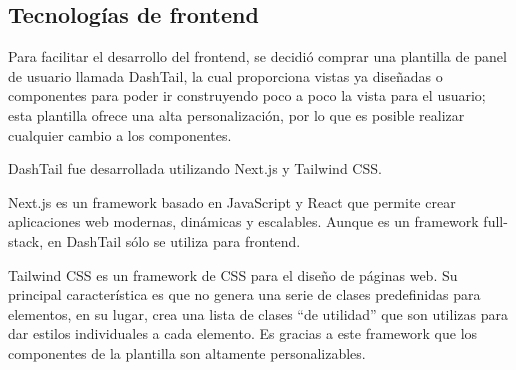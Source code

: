 \subsection{Tecnologías de frontend}
Para facilitar el desarrollo del frontend, se decidió comprar una plantilla de panel de usuario llamada DashTail, la cual proporciona vistas ya diseñadas o componentes para poder ir construyendo poco a poco la vista para el usuario; esta plantilla ofrece una alta personalización, por lo que es posible realizar cualquier cambio a los componentes.

DashTail fue desarrollada utilizando Next.js y Tailwind CSS. 

Next.js es un framework basado en JavaScript y React que permite crear aplicaciones web modernas, dinámicas y escalables. Aunque es un framework full-stack, en DashTail sólo se utiliza para frontend.

Tailwind CSS es un framework de CSS para el diseño de páginas web. Su principal característica es que no genera una serie de clases predefinidas para elementos, en su lugar, crea una lista de clases ``de utilidad'' que son utilizas para dar estilos individuales a cada elemento. Es gracias a este framework que los componentes de la plantilla son altamente personalizables.